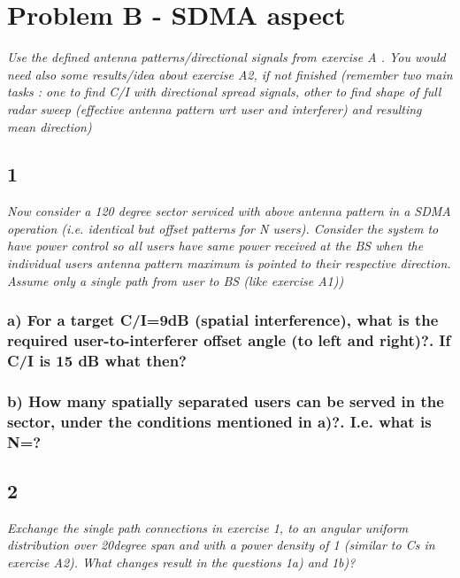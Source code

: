 \section{Problem B - SDMA aspect}
\textit{Use the defined antenna patterns/directional signals from exercise A . You would need also some results/idea about exercise A2, if not finished (remember two main tasks : one to find C/I with directional spread signals, other to find shape of full radar sweep (effective antenna pattern wrt user and interferer) and resulting mean direction)}

\subsection{1}
\textit{Now consider a 120 degree sector serviced with above antenna pattern in a SDMA operation (i.e. identical but offset patterns for N users). Consider the system to have power control so all users have same power received at the BS when the individual users antenna pattern maximum is pointed to their respective direction. Assume only a single path from user to BS (like exercise A1))}

\subsubsection{a) For a target C/I=9dB (spatial interference), what is the required user-to-interferer offset angle (to left and right)?. If C/I is 15 dB what then?}


\subsubsection{b) How many spatially separated users can be served in the sector, under the conditions mentioned in a)?. I.e. what is N=?}


\subsection{2}
\textit{Exchange the single path connections in exercise 1, to an angular uniform distribution over 20degree span and with a power density of 1 (similar to Cs in exercise A2). What changes result in the questions 1a) and 1b)?}

